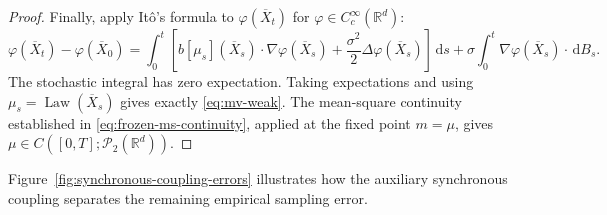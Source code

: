 \documentclass[11pt]{amsart}
\numberwithin{equation}{section}
\theoremstyle{plain}
\newcommand{\R}{\mathbb{R}}
\newcommand{\cP}{\mathcal{P}}
\newcommand{\dd}{\,\mathrm{d}}
\DeclareMathOperator{\Law}{Law}
\begin{document}
\begin{proof}
Finally, apply It\^o's formula to $\varphi(\overline X_t)$ for
$\varphi\in C_c^\infty(\R^d)$:
\[
 \varphi(\overline X_t)-\varphi(\overline X_0)
 =\int_0^t\left[
 b[\mu_s](\overline X_s)\cdot\nabla\varphi(\overline X_s)
 +\frac{\sigma^2}{2}\Delta\varphi(\overline X_s)\right]\dd s
 +\sigma\int_0^t\nabla\varphi(\overline X_s)\cdot\dd B_s.
\]
The stochastic integral has zero expectation.  Taking expectations and using
$\mu_s=\Law(\overline X_s)$ gives exactly \eqref{eq:mv-weak}.  The
mean-square continuity established in \eqref{eq:frozen-ms-continuity}, applied
at the fixed point $m=\mu$, gives $\mu\in C([0,T];\cP_2(\R^d))$.
\end{proof}

Figure~\ref{fig:synchronous-coupling-errors} illustrates how the auxiliary
synchronous coupling separates the remaining empirical sampling error.
\end{document}
